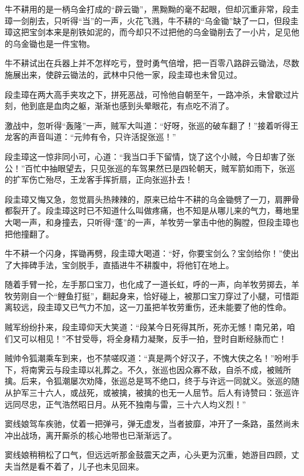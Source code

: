 \documentclass[12pt,oneside]{book}
\begin{document}
牛不耕用的是一柄乌金打成的``辟云锄''，黑黝黝的毫不起眼，但却沉重非常，段圭璋一剑削去，只听得``当''的一声，火花飞溅，牛不耕的``乌金锄''缺了一口，但段圭璋这把宝剑本来是削铁如泥的，而今却只不过把他的乌金锄削去了一小片，足见他的乌金锄也是一件宝物。

牛不耕试出在兵器上并不怎样吃亏，登时勇气倍增，把一百零八路辟云锄法，尽数施展出来，使辟云锄法的，武林中只他一家，段圭璋也未曾见过。

段圭璋在两大高手夹攻之下，拼死恶战，可怜他自朝至午，一路冲杀，未曾歇过片刻，他到底是血肉之躯，渐渐也感到头晕眼花，有点吃不消了。

激战中，忽听得``轰隆''一声，贼军大叫道：``好呀，张巡的破车翻了！''接着听得王龙客的声音叫道：``元帅有令，只许活捉张巡！''

段圭璋这一惊非同小可，心道：``我当口手下留情，饶了这个小贼，今日却害了张公！''百忙中抽眼望去，只见张巡的车驾果然已是四轮朝天，贼军箭如雨下，张巡的扩军伤亡殆尽，王龙客手挥折扇，正向张巡扑去！

段圭璋又悔又急，忽觉肩头热辣辣的，原来已给牛不耕的乌金锄劈了一刀，肩胛骨都裂开了。段圭璋这时已不知道什么叫做疼痛，也不知是从哪儿来的气力，蓦地里大喝一声，和身撞去，只听得``蓬''的一声，羊牧劳一掌击中他的胸膛，但段圭璋也把他撞翻了。

牛不耕一个闪身，挥锄再劈，段圭璋大喝道：``好，你要宝剑么？宝剑给你！''使出了大摔碑手法，宝剑脱手，直插进牛不耕腹中，将他钉在地上。

随着手臂一抡，左手那口宝刀，也化成了一道长虹，呼的一声，向羊牧劳掷去，羊牧劳刚自一个``鲤鱼打挺''，翻起身来，恰好碰上，被那口宝刀穿过了小腿，可惜距离较远，段圭璋又已气力不加，这一刀虽把羊牧劳重伤，还未能要了他的性命。

贼军纷纷扑来，段圭璋仰天大笑道：``段某今日死得其所，死亦无憾！南兄弟，咱们又可以相见！''不甘受辱，将全身精力凝聚，反手一拍，登时自断经脉而亡！

贼帅令狐潮乘车到来，也不禁嗟叹道：``真是两个好汉子，不愧大侠之名！''吩咐手下，将南霁云与段圭璋以礼葬之。不久，张巡也因众寡不敌，自杀不成，被贼所擒。后来，令狐潮屡次劝降，张巡总是骂不绝口，终于与许远一同就义。张巡的随从护军三十六人，或战死，或被擒，被擒的也无一人屈节。后人有诗赞曰：张巡许远同尽忠，正气浩然昭日月。从死不独南与雷，三十六人均义烈！''

窦线娘驾车疾驰，仗着一把弹弓，弹无虚发，当者披靡，冲开了一条路，虽然尚未冲出战场，离开厮杀的核心地带也已渐渐远了。

窦线娘稍稍松了口气，但远远听那金鼓震天之声，心头更为沉重，她游目四顾，丈夫当然是看不着了，儿子也未见回来。
\end{document}
